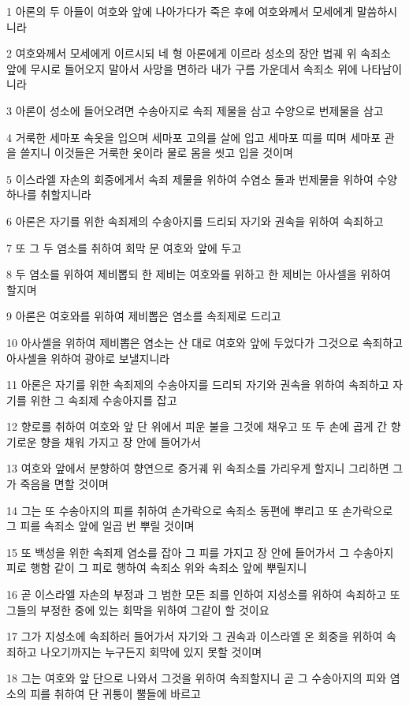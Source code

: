 \par 1 아론의 두 아들이 여호와 앞에 나아가다가 죽은 후에 여호와께서 모세에게 말씀하시니라
\par 2 여호와께서 모세에게 이르시되 네 형 아론에게 이르라 성소의 장안 법궤 위 속죄소 앞에 무시로 들어오지 말아서 사망을 면하라 내가 구름 가운데서 속죄소 위에 나타남이니라
\par 3 아론이 성소에 들어오려면 수송아지로 속죄 제물을 삼고 수양으로 번제물을 삼고
\par 4 거룩한 세마포 속옷을 입으며 세마포 고의를 살에 입고 세마포 띠를 띠며 세마포 관을 쓸지니 이것들은 거룩한 옷이라 물로 몸을 씻고 입을 것이며
\par 5 이스라엘 자손의 회중에게서 속죄 제물을 위하여 수염소 둘과 번제물을 위하여 수양 하나를 취할지니라
\par 6 아론은 자기를 위한 속죄제의 수송아지를 드리되 자기와 권속을 위하여 속죄하고
\par 7 또 그 두 염소를 취하여 회막 문 여호와 앞에 두고
\par 8 두 염소를 위하여 제비뽑되 한 제비는 여호와를 위하고 한 제비는 아사셀을 위하여 할지며
\par 9 아론은 여호와를 위하여 제비뽑은 염소를 속죄제로 드리고
\par 10 아사셀을 위하여 제비뽑은 염소는 산 대로 여호와 앞에 두었다가 그것으로 속죄하고 아사셀을 위하여 광야로 보낼지니라
\par 11 아론은 자기를 위한 속죄제의 수송아지를 드리되 자기와 권속을 위하여 속죄하고 자기를 위한 그 속죄제 수송아지를 잡고
\par 12 향로를 취하여 여호와 앞 단 위에서 피운 불을 그것에 채우고 또 두 손에 곱게 간 향기로운 향을 채워 가지고 장 안에 들어가서
\par 13 여호와 앞에서 분향하여 향연으로 증거궤 위 속죄소를 가리우게 할지니 그리하면 그가 죽음을 면할 것이며
\par 14 그는 또 수송아지의 피를 취하여 손가락으로 속죄소 동편에 뿌리고 또 손가락으로 그 피를 속죄소 앞에 일곱 번 뿌릴 것이며
\par 15 또 백성을 위한 속죄제 염소를 잡아 그 피를 가지고 장 안에 들어가서 그 수송아지 피로 행함 같이 그 피로 행하여 속죄소 위와 속죄소 앞에 뿌릴지니
\par 16 곧 이스라엘 자손의 부정과 그 범한 모든 죄를 인하여 지성소를 위하여 속죄하고 또 그들의 부정한 중에 있는 회막을 위하여 그같이 할 것이요
\par 17 그가 지성소에 속죄하러 들어가서 자기와 그 권속과 이스라엘 온 회중을 위하여 속죄하고 나오기까지는 누구든지 회막에 있지 못할 것이며
\par 18 그는 여호와 앞 단으로 나와서 그것을 위하여 속죄할지니 곧 그 수송아지의 피와 염소의 피를 취하여 단 귀퉁이 뿔들에 바르고

